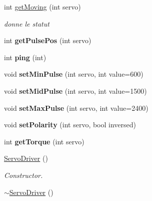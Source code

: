\begin{DoxyCompactItemize}
int \hyperlink{classServoDriver_a0a8e84f0bbcff39549ddfc239f1a6237}{get\+Moving} (int servo)
\begin{DoxyCompactList}\small\item\em donne le statut \end{DoxyCompactList}\item 
\mbox{\label{classServoDriver_a716d64d7b2203c9cb8dff5c90d0a5dd9}} 
int {\bfseries get\+Pulse\+Pos} (int servo)
\item 
\mbox{\label{classServoDriver_afc853f7f2f46acb7e4721f4ce4314522}} 
int {\bfseries ping} (int)
\item 
\mbox{\label{classServoDriver_a40ec259cb0ced3154b1e73cc52d48938}} 
void {\bfseries set\+Min\+Pulse} (int servo, int value=600)
\item 
\mbox{\label{classServoDriver_a92d53f7f50a7eb95e14ae358ad0b7d23}} 
void {\bfseries set\+Mid\+Pulse} (int servo, int value=1500)
\item 
\mbox{\label{classServoDriver_aaaeaab97cef5c2ebcd05c265fdff747f}} 
void {\bfseries set\+Max\+Pulse} (int servo, int value=2400)
\item 
\mbox{\label{classServoDriver_a89b2add38109f20260369e0a0d747bf2}} 
void {\bfseries set\+Polarity} (int servo, bool inversed)
\item 
\mbox{\label{classServoDriver_a108cce4f0dcf60bf443ee932621bc89c}} 
int {\bfseries get\+Torque} (int servo)
\item 
\mbox{\label{classServoDriver_a2076bae148e26ee3f854f1f1984d9714}} 
\hyperlink{classServoDriver_a2076bae148e26ee3f854f1f1984d9714}{Servo\+Driver} ()
\begin{DoxyCompactList}\small\item\em Constructor. \end{DoxyCompactList}\item 
\mbox{\label{classServoDriver_acf6cad7d5b891fbe4ff44eaec8409db7}} 
\hyperlink{classServoDriver_acf6cad7d5b891fbe4ff44eaec8409db7}{$\sim$\+Servo\+Driver} ()

\end{DoxyCompactItemize}
